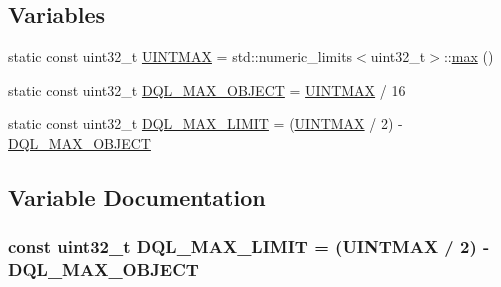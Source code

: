 \subsection*{Variables}
\begin{DoxyCompactItemize}
\item 
static const uint32\+\_\+t \hyperlink{dynamic-queue-limits_8cc_a3f63b751e6af68c85a8282699067ba2f}{U\+I\+N\+T\+M\+AX} = std\+::numeric\+\_\+limits$<$uint32\+\_\+t$>$\+::\hyperlink{80211b_8c_affe776513b24d84b39af8ab0930fef7f}{max} ()
\item 
static const uint32\+\_\+t \hyperlink{dynamic-queue-limits_8cc_aed676d6549bb66a98d23fc5947d89e7c}{D\+Q\+L\+\_\+\+M\+A\+X\+\_\+\+O\+B\+J\+E\+CT} = \hyperlink{dynamic-queue-limits_8cc_a3f63b751e6af68c85a8282699067ba2f}{U\+I\+N\+T\+M\+AX} / 16
\item 
static const uint32\+\_\+t \hyperlink{dynamic-queue-limits_8cc_a24f26d18ca1562a31ad086b0d6cef65b}{D\+Q\+L\+\_\+\+M\+A\+X\+\_\+\+L\+I\+M\+IT} = (\hyperlink{dynamic-queue-limits_8cc_a3f63b751e6af68c85a8282699067ba2f}{U\+I\+N\+T\+M\+AX} / 2) -\/ \hyperlink{dynamic-queue-limits_8cc_aed676d6549bb66a98d23fc5947d89e7c}{D\+Q\+L\+\_\+\+M\+A\+X\+\_\+\+O\+B\+J\+E\+CT}
\end{DoxyCompactItemize}


\subsection{Variable Documentation}
\subsubsection[{\texorpdfstring{D\+Q\+L\+\_\+\+M\+A\+X\+\_\+\+L\+I\+M\+IT}{DQL_MAX_LIMIT}}]{\setlength{\rightskip}{0pt plus 5cm}const uint32\+\_\+t D\+Q\+L\+\_\+\+M\+A\+X\+\_\+\+L\+I\+M\+IT = ({\bf U\+I\+N\+T\+M\+AX} / 2) -\/ {\bf D\+Q\+L\+\_\+\+M\+A\+X\+\_\+\+O\+B\+J\+E\+CT}\hspace{0.3cm}{\ttfamily [static]}}\hypertarget{dynamic-queue-limits_8cc_a24f26d18ca1562a31ad086b0d6cef65b}{}\label{dynamic-queue-limits_8cc_a24f26d18ca1562a31ad086b0d6cef65b}
